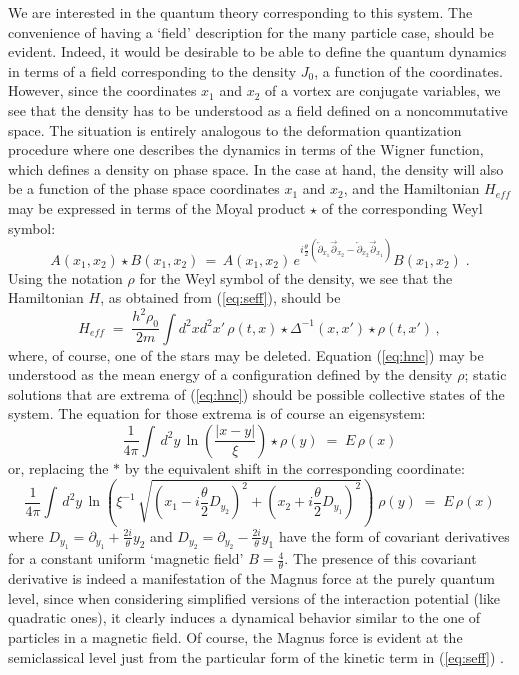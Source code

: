 \documentclass[a4paper,12pt]{article} \tolerance=200
\begin{document}
We are interested in the quantum theory corresponding to this system.
The convenience of having a `field' description for the many particle
case, should be evident. Indeed, it would be desirable to be able to
define the quantum dynamics in terms of a field corresponding to the
density $J_0$, a function of the coordinates. However, since the
coordinates $x_1$ and $x_2$ of a vortex are conjugate variables, we
see that the density has to be understood as a field defined on a
noncommutative space. The situation is entirely analogous to the
deformation quantization procedure \cite{Zachos} where one describes
the dynamics in terms of the Wigner function, which defines a density
on phase space. In the case at hand, the density will also be a
function of the phase space coordinates $x_1$ and $x_2$, and the
Hamiltonian $H_{eff}$ may be expressed in terms of the Moyal product
$\star$ of the corresponding Weyl symbol:
\begin{equation}
A(x_1,x_2) \star B(x_1,x_2) \,=\, A (x_1,x_2)\, e^{i \frac{\theta}{2} 
({\overleftarrow \partial_{x_1}} {\overrightarrow \partial_{x_2}} 
- {\overleftarrow \partial_{x_2}} {\overrightarrow \partial_{x_1}})}B(x_1,x_2)\;.
\end{equation}
Using the notation $\rho$ for the Weyl symbol of the density, we see that
the Hamiltonian $H$, as obtained from (\ref{eq:seff}), should be
\begin{equation}\label{eq:hnc}
H_{eff}\;=\; \frac{h^2 \rho_0}{2 m} \int d^2x d^2x'\, \rho(t,x)\star \Delta^{-1}(x,x') \star \rho(t,x') \,,
\end{equation}
where, of course, one of the stars may be deleted. Equation
(\ref{eq:hnc}) may be understood as the mean energy of a configuration
defined by the density $\rho$; static solutions that are extrema of
(\ref{eq:hnc}) should be possible collective states of the system. The
equation for those extrema is of course an eigensystem:
\begin{equation}
\frac{1}{4\pi}\int\, d^2y\,  \ln (\frac{|x-y|}{\xi}) \star \rho (y) \;=\; E \, \rho (x) 
\end{equation}  
or, replacing the $*$ by the equivalent shift in the corresponding
coordinate:
\begin{equation}
\frac{1}{4\pi}\int\, d^2y\,  \ln (
\xi^{-1}\, \sqrt{(x_1-i\frac{\theta}{2} D_{y_2})^2 + (x_2+i\frac{\theta}{2} D_{y_1})^2})\; \rho (y) 
\;=\; E \, \rho (x) 
\end{equation}
where $D_{y_1} = \partial_{y_1} + \frac{2 i}{\theta}y_2$ and $D_{y_2} = \partial_{y_2} -
\frac{2 i}{\theta} y_1$ have the form of covariant derivatives for a
constant uniform `magnetic field' $B = \frac{4}{\theta}$.  The presence of
this covariant derivative is indeed a manifestation of the Magnus
force at the purely quantum level, since when considering simplified
versions of the interaction potential (like quadratic ones), it
clearly induces a dynamical behavior similar to the one of particles
in a magnetic field. Of course, the Magnus force is evident at the
semiclassical level just from the particular form of the kinetic term
in (\ref{eq:seff}) \cite{MS}.
\end{document}
